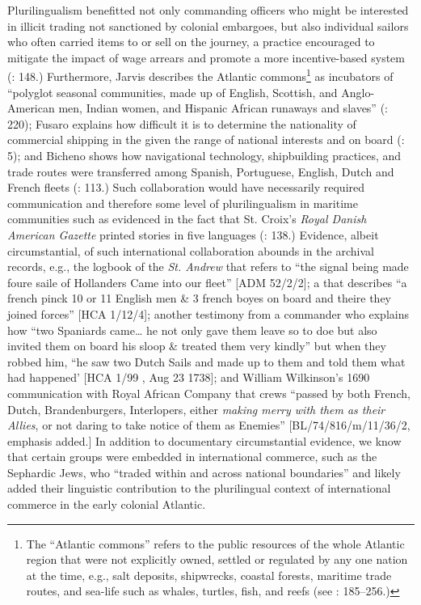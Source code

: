 Plurilingualism benefitted not only commanding officers who might be interested in illicit trading not sanctioned by colonial embargoes, but also individual sailors who often carried items to  or sell on the journey, a practice encouraged to mitigate the impact of wage arrears and promote a more incentive-based system (\citealt{Jarvis2010}: 148.) Furthermore, Jarvis describes the Atlantic commons\footnote{The “Atlantic commons” refers to the public resources of the whole Atlantic region that were not explicitly owned, settled or regulated by any one nation at the time, e.g., salt deposits, shipwrecks, coastal forests, maritime trade routes, and sea-life such as whales, turtles, fish, and reefs (see \citealt{Jarvis2010}: 185--256.)} as incubators of “polyglot seasonal communities, made up of English, Scottish, and Anglo-American men, Indian women, and Hispanic African runaways and slaves” (\citeyear*{Jarvis2010}: 220); Fusaro explains how difficult it is to determine the nationality of commercial shipping in the  given the range of national interests and  on board (\citeyear*{Fusaro2015}: 5); and Bicheno shows how navigational technology, shipbuilding practices, and trade routes were transferred among Spanish, Portuguese, English, Dutch and French fleets (\citeyear*{Bicheno2012}: 113.) Such collaboration would have necessarily required communication and therefore some level of plurilingualism in maritime communities such as evidenced in the fact that St. Croix’s \textit{Royal Danish American Gazette} printed stories in five languages (\citealt{Jarvis2010}: 138.) Evidence, albeit circumstantial, of such international collaboration abounds in the archival records, e.g., the logbook of the \textit{St. Andrew} that refers to “the signal being made foure saile of Hollanders Came into our fleet” [ADM 52/2/2]; a  that describes “a french pinck 10 or 11 English men \& 3 french boyes on board and theire they joined forces” [HCA 1/12/4]; another testimony from a commander who explains how “two Spaniards came… he not only gave them leave so to doe but also invited them on board his sloop \& treated them very kindly” but when they robbed him, “he saw two Dutch Sails and made up to them and told them what had happened’ [HCA 1/99 , Aug 23 1738]; and William Wilkinson’s 1690 communication with Royal African Company that  crews “passed by both French, Dutch, Brandenburgers, Interlopers, either \textit{making merry with them as their Allies}, or not daring to take notice of them as Enemies” [BL/74/816/m/11/36/2, emphasis added.] In addition to documentary circumstantial evidence, we know that certain groups were embedded in international commerce, such as the Sephardic Jews, who “traded within and across national boundaries” \citep[20]{Jarvis2010} and likely added their linguistic contribution to the plurilingual context of international commerce in the early colonial Atlantic. 

